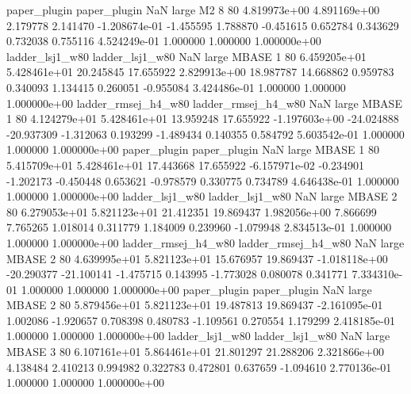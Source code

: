        paper_plugin        paper_plugin                   NaN      large       M2                 8 80 4.819973e+00   4.891169e+00      2.179778       2.141470 -1.208674e-01     -1.455595      1.788870    -0.451615       0.652784  0.343629   0.732038     0.755116   4.524249e-01            1.000000        1.000000        1.000000e+00
    ladder_lsj1_w80     ladder_lsj1_w80                   NaN      large    MBASE                 1 80 6.459205e+01   5.428461e+01     20.245845      17.655922  2.829913e+00     18.987787     14.668862     0.959783       0.340093  1.134415   0.260051    -0.955084   3.424486e-01            1.000000        1.000000        1.000000e+00
ladder_rmsej_h4_w80 ladder_rmsej_h4_w80                   NaN      large    MBASE                 1 80 4.124279e+01   5.428461e+01     13.959248      17.655922 -1.197603e+00    -24.024888    -20.937309    -1.312063       0.193299 -1.489434   0.140355     0.584792   5.603542e-01            1.000000        1.000000        1.000000e+00
       paper_plugin        paper_plugin                   NaN      large    MBASE                 1 80 5.415709e+01   5.428461e+01     17.443668      17.655922 -6.157971e-02     -0.234901     -1.202173    -0.450448       0.653621 -0.978579   0.330775     0.734789   4.646438e-01            1.000000        1.000000        1.000000e+00
    ladder_lsj1_w80     ladder_lsj1_w80                   NaN      large    MBASE                 2 80 6.279053e+01   5.821123e+01     21.412351      19.869437  1.982056e+00      7.866699      7.765265     1.018014       0.311779  1.184009   0.239960    -1.079948   2.834513e-01            1.000000        1.000000        1.000000e+00
ladder_rmsej_h4_w80 ladder_rmsej_h4_w80                   NaN      large    MBASE                 2 80 4.639995e+01   5.821123e+01     15.676957      19.869437 -1.018118e+00    -20.290377    -21.100141    -1.475715       0.143995 -1.773028   0.080078     0.341771   7.334310e-01            1.000000        1.000000        1.000000e+00
       paper_plugin        paper_plugin                   NaN      large    MBASE                 2 80 5.879456e+01   5.821123e+01     19.487813      19.869437 -2.161095e-01      1.002086     -1.920657     0.708398       0.480783 -1.109561   0.270554     1.179299   2.418185e-01            1.000000        1.000000        1.000000e+00
    ladder_lsj1_w80     ladder_lsj1_w80                   NaN      large    MBASE                 3 80 6.107161e+01   5.864461e+01     21.801297      21.288206  2.321866e+00      4.138484      2.410213     0.994982       0.322783  0.472801   0.637659    -1.094610   2.770136e-01            1.000000        1.000000        1.000000e+00
